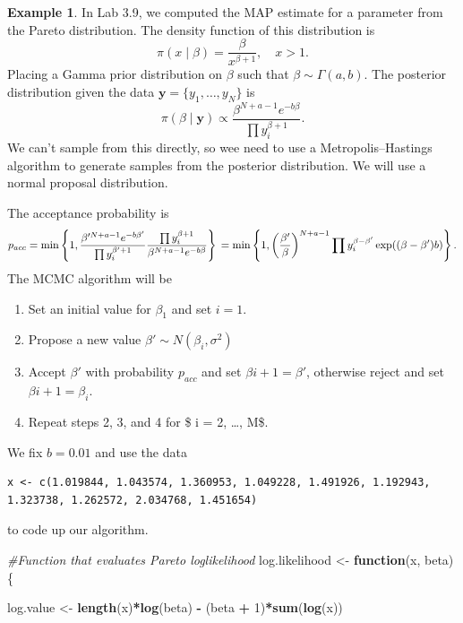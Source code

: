 \documentclass[
]{book}
\newenvironment{Shaded}{\begin{snugshade}}{\end{snugshade}}
\newcommand{\CommentTok}[1]{\textcolor[rgb]{0.56,0.35,0.01}{\textit{#1}}}
\newcommand{\ControlFlowTok}[1]{\textcolor[rgb]{0.13,0.29,0.53}{\textbf{#1}}}
\newcommand{\DecValTok}[1]{\textcolor[rgb]{0.00,0.00,0.81}{#1}}
\newcommand{\FunctionTok}[1]{\textcolor[rgb]{0.13,0.29,0.53}{\textbf{#1}}}
\newcommand{\NormalTok}[1]{#1}
\newcommand{\OtherTok}[1]{\textcolor[rgb]{0.56,0.35,0.01}{#1}}
\newcommand{\SpecialCharTok}[1]{\textcolor[rgb]{0.81,0.36,0.00}{\textbf{#1}}}
\providecommand{\tightlist}{%
  \setlength{\itemsep}{0pt}\setlength{\parskip}{0pt}}
\theoremstyle{definition}
\theoremstyle{definition}
\newtheorem{example}{Example}[chapter]
\theoremstyle{definition}
\theoremstyle{definition}
\theoremstyle{remark}
\begin{document}
\begin{example}
In Lab 3.9, we computed the MAP estimate for a parameter from the Pareto distribution. The density function of this distribution is
\[
\pi(x \mid \beta) = \frac{\beta}{x^{\beta + 1}}, \quad x > 1. 
\]
Placing a Gamma prior distribution on \(\beta\) such that \(\beta \sim \Gamma(a, b)\). The posterior distribution given the data \(\boldsymbol{y} = \{y_1, \ldots, y_N\}\) is
\[
\pi(\beta \mid \boldsymbol{y}) \propto \frac{\beta^{N + a - 1}e^{-b\beta}}{\prod y_i^{\beta + 1}}.
\]
We can't sample from this directly, so wee need to use a Metropolis--Hastings algorithm to generate samples from the posterior distribution. We will use a normal proposal distribution.

The acceptance probability is
\[
p_{acc} = \min \left\{1, \frac{\beta'^{N + a - 1}e^{-b\beta'}}{\prod y_i^{\beta' + 1}}\frac{\prod y_i^{\beta + 1}}{\beta^{N + a - 1}e^{-b\beta}} \right\} \\
= \min \left\{1, \left(\frac{\beta'}{\beta}\right)^{N + a - 1}{\prod y_i^{\beta - \beta'}}\exp((\beta - \beta')b) \right\}. 
\]
The MCMC algorithm will be

\begin{enumerate}
\def\labelenumi{\arabic{enumi}.}
\tightlist
\item
  Set an initial value for \(\beta_1\) and set \(i =1\).
\item
  Propose a new value \(\beta' \sim N(\beta_i, \sigma^2)\)
\item
  Accept \(\beta'\) with probability \(p_{acc}\) and set \(\beta{i+1}= \beta'\), otherwise reject and set\(\beta{i+1}= \beta_i\).
\item
  Repeat steps 2, 3, and 4 for \$ i = 2, \ldots, M\$.
\end{enumerate}

We fix \(b=0.01\) and use the data

\begin{verbatim}
x <- c(1.019844, 1.043574, 1.360953, 1.049228, 1.491926, 1.192943, 1.323738, 1.262572, 2.034768, 1.451654)
\end{verbatim}

to code up our algorithm.

\begin{Shaded}
\begin{Highlighting}[]
\CommentTok{\#Function that evaluates Pareto loglikelihood}
\NormalTok{log.likelihood }\OtherTok{\textless{}{-}} \ControlFlowTok{function}\NormalTok{(x, beta)\{}

\NormalTok{  log.value }\OtherTok{\textless{}{-}} \FunctionTok{length}\NormalTok{(x)}\SpecialCharTok{*}\FunctionTok{log}\NormalTok{(beta) }\SpecialCharTok{{-}}\NormalTok{ (beta }\SpecialCharTok{+} \DecValTok{1}\NormalTok{)}\SpecialCharTok{*}\FunctionTok{sum}\NormalTok{(}\FunctionTok{log}\NormalTok{(x))}


\end{Highlighting}
\end{Shaded}
\end{example}
\end{document}
